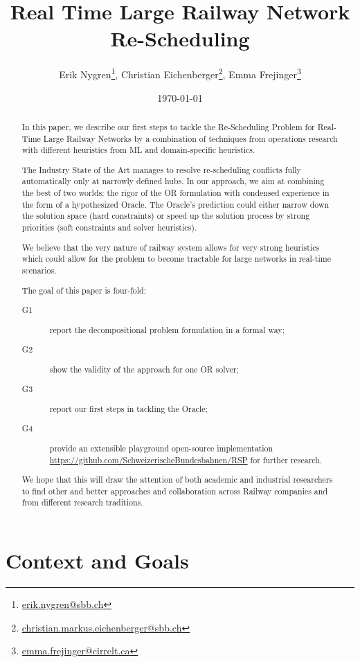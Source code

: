 \documentclass{article}
\title{Real Time Large Railway Network Re-Scheduling}
\author{Erik Nygren\footnote{\url{erik.nygren@sbb.ch}}, Christian Eichenberger\footnote{\url{christian.markus.eichenberger@sbb.ch}}, Emma Frejinger\footnote{\url{emma.frejinger@cirrelt.ca}}}
\date{\today}
\begin{document}
\maketitle

\tableofcontents
\begin{abstract}
In this paper, we describe our first steps to tackle the Re-Scheduling Problem for Real-Time Large Railway Networks by a combination of techniques from operations research with different heuristics from ML and domain-specific heuristics.

The Industry State of the Art manages to resolve re-scheduling conflicts fully automatically only at narrowly defined hubs. In our approach, we aim at combining the best of two worlds: the rigor of the OR formulation with condensed experience in the form of a hypothesized Oracle. The Oracle's prediction could either narrow down the solution space (hard constraints) or speed up the solution process by strong priorities (soft constraints and solver heuristics).

We believe that the very nature of railway system allows for very strong heuristics which could allow for the problem to become tractable for large networks in real-time scenarios.

The goal of this paper is four-fold:
\begin{description}
\item[G1] report the decompositional problem formulation in a formal way;
\item[G2] show the validity of the approach for one OR solver;
\item[G3] report our first steps in tackling the Oracle;
\item[G4] provide an extensible playground open-source implementation \url{https://github.com/SchweizerischeBundesbahnen/RSP} for further research.
\end{description}
 We hope that this will draw the attention of both academic and industrial researchers to find other and better approaches and collaboration across Railway companies and from different research traditions.
\end{abstract}



\section{Context and Goals}
\end{document}

